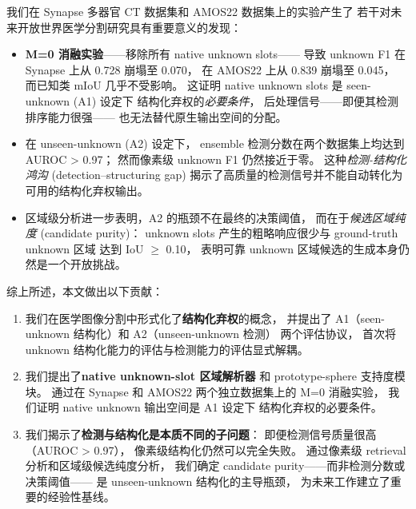 \documentclass[3p,twocolumn,authoryear]{elsarticle}
\begin{document}
 
我们在 Synapse 多器官 CT 数据集和
AMOS22 数据集上的实验产生了
若干对未来开放世界医学分割研究具有重要意义的发现：
 
\begin{itemize}
  \item \textbf{M=0 消融实验}——移除所有 native unknown slots——
  导致 unknown F1 在 Synapse 上从 0.728 崩塌至 0.070，
  在 AMOS22 上从 0.839 崩塌至 0.045，
  而已知类 mIoU 几乎不受影响。
  这证明 native unknown slots 是 seen-unknown (A1) 设定下
  结构化弃权的\emph{必要条件}，
  后处理信号——即便其检测排序能力很强——
  也无法替代原生输出空间的分配。
 
  \item 在 unseen-unknown (A2) 设定下，
  ensemble 检测分数在两个数据集上均达到 AUROC > 0.97；
  然而像素级 unknown F1 仍然接近于零。
  这种\emph{检测-结构化鸿沟} (detection--structuring gap)
  揭示了高质量的检测信号并不能自动转化为可用的结构化弃权输出。
 
  \item 区域级分析进一步表明，A2 的瓶颈不在最终的决策阈值，
  而在于\emph{候选区域纯度} (candidate purity)：
  unknown slots 产生的粗略响应很少与 ground-truth unknown 区域
  达到 IoU $\geq$ 0.10，
  表明可靠 unknown 区域候选的生成本身仍然是一个开放挑战。
\end{itemize}
 
 
综上所述，本文做出以下贡献：
 
\begin{enumerate}
  \item 我们在医学图像分割中形式化了\textbf{结构化弃权}的概念，
  并提出了 A1（seen-unknown 结构化）和 A2（unseen-unknown 检测）
  两个评估协议，
  首次将 unknown 结构化能力的评估与检测能力的评估显式解耦。
 
  \item 我们提出了\textbf{native unknown-slot 区域解析器}
  和 prototype-sphere 支持度模块。
  通过在 Synapse 和 AMOS22 两个独立数据集上的 M=0 消融实验，
  我们证明 native unknown 输出空间是 A1 设定下
  结构化弃权的必要条件。
 
  \item 我们揭示了\textbf{检测与结构化是本质不同的子问题}：
  即便检测信号质量很高（AUROC > 0.97），
  像素级结构化仍然可以完全失败。
  通过像素级 retrieval 分析和区域级候选纯度分析，
  我们确定 candidate purity——而非检测分数或决策阈值——
  是 unseen-unknown 结构化的主导瓶颈，
  为未来工作建立了重要的经验性基线。
\end{enumerate}
 
\end{document}
